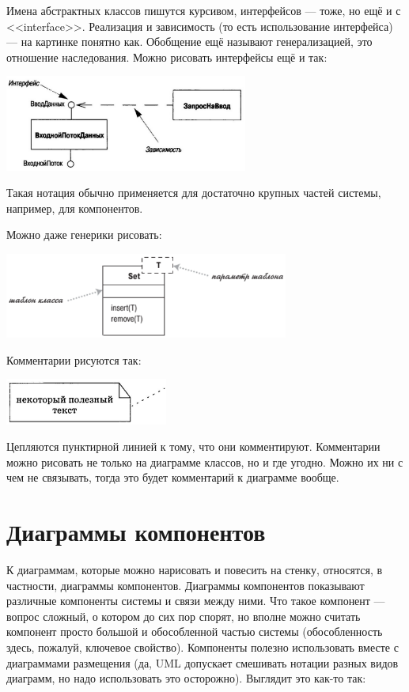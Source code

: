 \documentclass[a5paper]{article}
\begin{document}
Имена абстрактных классов пишутся курсивом, интерфейсов --- тоже, но ещё и с <<interface>>. Реализация и зависимость (то есть использование интерфейса) --- на картинке понятно как. Обобщение ещё называют генерализацией, это отношение наследования. Можно рисовать интерфейсы ещё и так:

\begin{center}
    \includegraphics[width=0.6\textwidth]{interfaces2.png}
\end{center}

Такая нотация обычно применяется для достаточно крупных частей системы, например, для компонентов.

Можно даже генерики рисовать:

\begin{center}
    \includegraphics[width=0.7\textwidth]{templates.png}
\end{center}

Комментарии рисуются так:

\begin{center}
    \includegraphics[width=0.4\textwidth]{comment.png}
\end{center}

Цепляются пунктирной линией к тому, что они комментируют. Комментарии можно рисовать не только на диаграмме классов, но и где угодно. Можно их ни с чем не связывать, тогда это будет комментарий к диаграмме вообще.

\section{Диаграммы компонентов}

К диаграммам, которые можно нарисовать и повесить на стенку, относятся, в частности, диаграммы компонентов. Диаграммы компонентов показывают различные компоненты системы и связи между ними. Что такое компонент --- вопрос сложный, о котором до сих пор спорят, но вполне можно считать компонент просто большой и обособленной частью системы (обособленность здесь, пожалуй, ключевое свойство). Компоненты полезно использовать вместе с диаграммами размещения (да, UML допускает смешивать нотации разных видов диаграмм, но надо использовать это осторожно). Выглядит это как-то так:
\end{document}
